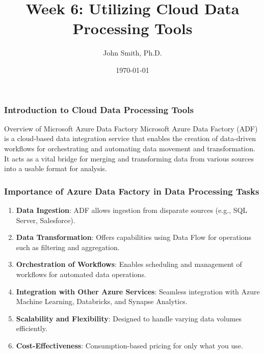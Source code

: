 \documentclass[aspectratio=169]{beamer}
\title[Week 6: Utilizing Cloud Data Processing Tools]{Week 6: Utilizing Cloud Data Processing Tools}
\author[J. Smith]{John Smith, Ph.D.}
\institute[University Name]{
  Department of Computer Science\\
  University Name\\
  \vspace{0.3cm}
  Email: email@university.edu\\
  Website: www.university.edu
}
\date{\today}
\begin{document}
\frame{\titlepage}

\begin{frame}[fragile]
    \frametitle{Introduction to Cloud Data Processing Tools}
    \begin{block}{Overview of Microsoft Azure Data Factory}
        Microsoft Azure Data Factory (ADF) is a cloud-based data integration service that enables the creation of data-driven workflows for orchestrating and automating data movement and transformation. It acts as a vital bridge for merging and transforming data from various sources into a usable format for analysis.
    \end{block}
\end{frame}

\begin{frame}[fragile]
    \frametitle{Importance of Azure Data Factory in Data Processing Tasks}
    \begin{enumerate}
        \item \textbf{Data Ingestion}: ADF allows ingestion from disparate sources (e.g., SQL Server, Salesforce).
        \item \textbf{Data Transformation}: Offers capabilities using Data Flow for operations such as filtering and aggregation.
        \item \textbf{Orchestration of Workflows}: Enables scheduling and management of workflows for automated data operations.
        \item \textbf{Integration with Other Azure Services}: Seamless integration with Azure Machine Learning, Databricks, and Synapse Analytics.
        \item \textbf{Scalability and Flexibility}: Designed to handle varying data volumes efficiently.
        \item \textbf{Cost-Effectiveness}: Consumption-based pricing for only what you use.
    \end{enumerate}
\end{frame}
\end{document}
